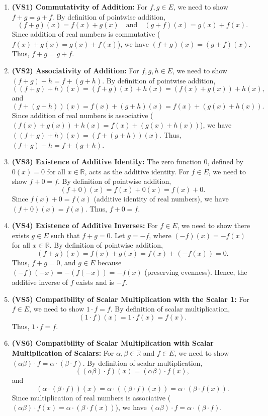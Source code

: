 \documentclass{article}
\theoremstyle{definition}
\begin{document}
\begin{enumerate}
    \item \textbf{(VS1) Commutativity of Addition:} For \( f, g \in E \), we need to show \( f + g = g + f \). By definition of pointwise addition,
    \[
    (f + g)(x) = f(x) + g(x) \quad \text{and} \quad (g + f)(x) = g(x) + f(x).
    \]
    Since addition of real numbers is commutative (\( f(x) + g(x) = g(x) + f(x) \)), we have \( (f + g)(x) = (g + f)(x) \). Thus, \( f + g = g + f \).

    \item \textbf{(VS2) Associativity of Addition:} For \( f, g, h \in E \), we need to show \( (f + g) + h = f + (g + h) \). By definition of pointwise addition,
    \[
    ((f + g) + h)(x) = (f + g)(x) + h(x) = (f(x) + g(x)) + h(x),
    \]
    and
    \[
    (f + (g + h))(x) = f(x) + (g + h)(x) = f(x) + (g(x) + h(x)).
    \]
    Since addition of real numbers is associative (\( (f(x) + g(x)) + h(x) = f(x) + (g(x) + h(x)) \)), we have \( ((f + g) + h)(x) = (f + (g + h))(x) \). Thus, \( (f + g) + h = f + (g + h) \).

    \item \textbf{(VS3) Existence of Additive Identity:} The zero function \( 0 \), defined by \( 0(x) = 0 \) for all \( x \in \mathbb{R} \), acts as the additive identity. For \( f \in E \), we need to show \( f + 0 = f \). By definition of pointwise addition,
    \[
    (f + 0)(x) = f(x) + 0(x) = f(x) + 0.
    \]
    Since \( f(x) + 0 = f(x) \) (additive identity of real numbers), we have \( (f + 0)(x) = f(x) \). Thus, \( f + 0 = f \).

    \item \textbf{(VS4) Existence of Additive Inverses:} For \( f \in E \), we need to show there exists \( g \in E \) such that \( f + g = 0 \). Let \( g = -f \), where \( (-f)(x) = -f(x) \) for all \( x \in \mathbb{R} \). By definition of pointwise addition,
    \[
    (f + g)(x) = f(x) + g(x) = f(x) + (-f(x)) = 0.
    \]
    Thus, \( f + g = 0 \), and \( g \in E \) because \( (-f)(-x) = -(f(-x)) = -f(x) \) (preserving evenness). Hence, the additive inverse of \( f \) exists and is \( -f \).

    \item \textbf{(VS5) Compatibility of Scalar Multiplication with the Scalar 1:} For \( f \in E \), we need to show \( 1 \cdot f = f \). By definition of scalar multiplication,
    \[
    (1 \cdot f)(x) = 1 \cdot f(x) = f(x).
    \]
    Thus, \( 1 \cdot f = f \).

    \item \textbf{(VS6) Compatibility of Scalar Multiplication with Scalar Multiplication of Scalars:} For \( \alpha, \beta \in \mathbb{R} \) and \( f \in E \), we need to show \( (\alpha \beta) \cdot f = \alpha \cdot (\beta \cdot f) \). By definition of scalar multiplication,
    \[
    ((\alpha \beta) \cdot f)(x) = (\alpha \beta) \cdot f(x),
    \]
    and
    \[
    (\alpha \cdot (\beta \cdot f))(x) = \alpha \cdot ((\beta \cdot f)(x)) = \alpha \cdot (\beta \cdot f(x)).
    \]
    Since multiplication of real numbers is associative (\( (\alpha \beta) \cdot f(x) = \alpha \cdot (\beta \cdot f(x)) \)), we have \( (\alpha \beta) \cdot f = \alpha \cdot (\beta \cdot f) \).


\end{enumerate}
\end{document}
